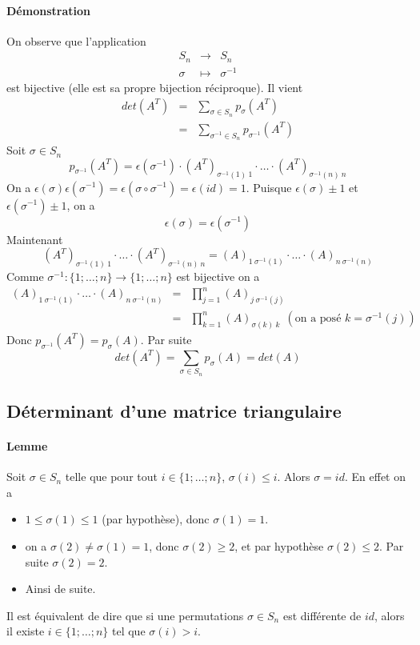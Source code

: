 \paragraph{Démonstration} On observe que l'application
\begin{eqnarray*}
  S_n &\rightarrow& S_n \\
  \sigma &\mapsto& \sigma^{-1}
\end{eqnarray*}
est bijective (elle est sa propre bijection réciproque). Il vient
\begin{eqnarray*}
  det(A^{T}) &=& \sum_{\sigma \in S_n} p_{\sigma}(A^{T}) \\
    &=& \sum_{\sigma^{-1} \in S_n} p_{\sigma^{-1}}(A^{T})
\end{eqnarray*}
Soit $\sigma \in S_n$
$$p_{\sigma^{-1}}(A^{T}) = \epsilon(\sigma^{-1}) \cdot (A^{T})_{\sigma^{-1}(1) ~ 1} \cdot \ldots \cdot (A^{T})_{\sigma^{-1}(n) ~ n}$$
On a $\epsilon(\sigma) \epsilon(\sigma^{-1}) = \epsilon(\sigma \circ \sigma^{-1}) = \epsilon(id) = 1$. Puisque $\epsilon(\sigma) \pm 1$ et $\epsilon(\sigma^{-1}) \pm 1$, on a 
$$\epsilon(\sigma) = \epsilon(\sigma^{-1})$$
Maintenant
$$(A^{T})_{\sigma^{-1}(1) ~ 1} \cdot \ldots \cdot (A^{T})_{\sigma^{-1}(n) ~ n} = (A)_{1 ~ \sigma^{-1}(1)} \cdot \ldots \cdot (A)_{n ~ \sigma^{-1}(n)}$$
Comme $\sigma^{-1}: \{1; \ldots; n\} \rightarrow \{1; \ldots; n\}$ est bijective on a
\begin{eqnarray*}
  (A)_{1 ~ \sigma^{-1}(1)} \cdot \ldots \cdot (A)_{n ~ \sigma^{-1}(n)} &=& \prod_{j=1}^n (A)_{j ~ \sigma^{-1}(j)} \\
    &=& \prod_{k=1}^n (A)_{\sigma(k) ~ k} ~~ (\text{on a posé } k = \sigma^{-1}(j))
\end{eqnarray*}
Donc $p_{\sigma^{-1}}(A^{T}) = p_{\sigma}(A)$. Par suite
$$det(A^{T}) = \sum_{\sigma \in S_n} p_{\sigma}(A) = det(A)$$

%
\subsection{Déterminant d'une matrice triangulaire}
%

\paragraph{Lemme} Soit $\sigma \in S_n$ telle que pour tout $i \in \{1; \ldots; n\}$, $\sigma(i) \leq i$. Alors $\sigma  = id$. En effet on a
\begin{itemize}
  \item $1 \leq \sigma(1) \leq 1$ (par hypothèse), donc $\sigma(1) = 1$.
  \item on a $\sigma(2) \neq \sigma(1) = 1$, donc $\sigma(2) \geq 2$, et par hypothèse $\sigma(2) \leq 2$. Par suite $\sigma(2) = 2$.
  \item Ainsi de suite.
\end{itemize}
Il est équivalent de dire que si une permutations $\sigma \in S_n$ est différente de $id$, alors il existe $i \in \{1; \ldots; n\}$ tel que $\sigma(i) > i$.

